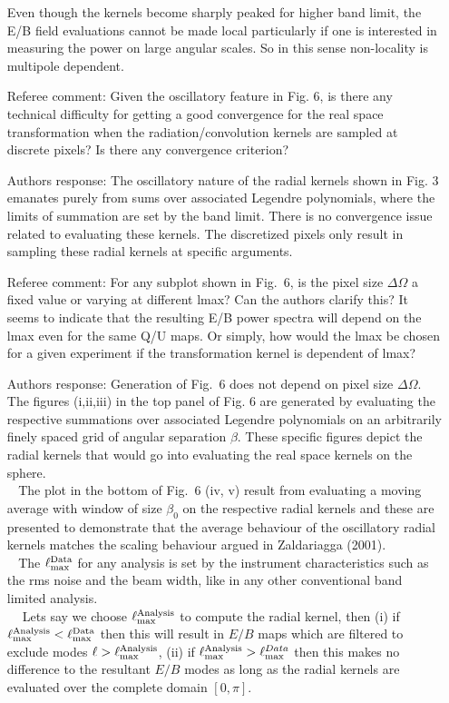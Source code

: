 \documentclass[12pt]{article}
\begin{document}
\begin{itemize}
 Even though the kernels become sharply peaked for higher band limit, the E/B field evaluations cannot be made local particularly if one is interested in measuring the power on large angular scales. So in this sense non-locality is multipole dependent.
 
\item[{Referee comment: }] Given the oscillatory feature in Fig. 6, is there any technical difficulty for getting a good convergence for the real space transformation when the radiation/convolution kernels are sampled at discrete pixels? Is there any convergence criterion?
\item[{Authors response: }]  The oscillatory nature of the radial kernels shown in Fig. 3 emanates purely from sums over associated Legendre polynomials, where the limits of summation are set by the band limit. There is no convergence issue related to evaluating these kernels. The discretized pixels only result in sampling these radial kernels at specific arguments.

\item[{Referee comment: }] For any subplot shown in Fig.~6, is the pixel size $\Delta \Omega$ a fixed value or varying at different lmax? Can the authors clarify this? It seems to indicate that the resulting E/B power spectra will depend on the lmax even for the same Q/U maps. Or simply, how would the lmax be chosen for a given experiment if the transformation kernel is dependent of lmax?
\item[{Authors response: }] Generation of Fig.~6 does not depend on pixel size $\Delta \Omega$. The figures (\rm i,\rm {ii},\rm {iii}) in the top panel of Fig. 6 are generated by evaluating the respective summations over associated Legendre polynomials on an arbitrarily finely spaced grid of angular separation $\beta$. These specific figures depict the radial kernels that would go into evaluating the real space kernels on the sphere.\\
$~~~~$The plot in the bottom of Fig.~6 (\rm iv, \rm v) result from evaluating a moving average with window of size $\beta_0$ on the respective radial kernels and these are presented to demonstrate that the average behaviour of the oscillatory radial kernels matches the scaling behaviour argued in Zaldariagga (2001).\\
$~~~~$The $\ell^{\rm Data}_{\rm max}$ for any analysis is set by the instrument characteristics such as the rms noise and the  beam width, like in any other conventional band limited analysis.\\
$~~~~$ Lets say we choose $\ell_{\rm max}^{\rm Analysis}$ to compute the radial kernel, then (i) if  $\ell_{\rm max}^{\rm Analysis}< \ell^{\rm Data}_{\rm max}$ then this will result in $E/B$ maps which are filtered to exclude modes $\ell > \ell_{\rm max}^{\rm Analysis}$, (ii) if  $\ell_{\rm max}^{\rm Analysis}> \ell^{Data}_{\rm max}$ then this makes no difference to the resultant $E/B$ modes as long as the radial kernels are evaluated over the complete domain $[0,\pi]$.


\end{itemize}
\end{document}

